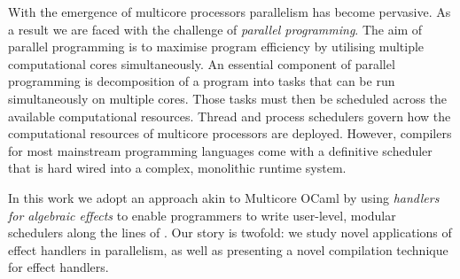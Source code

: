 \documentclass[12pt,mscres,cdtppar,twoside,openright,logo,rightchapter,normalheadings]{infthesis}
\theoremstyle{definition}
\begin{document}
%


%

With the emergence of multicore processors parallelism has become
pervasive. As a result we are faced with the challenge of
\emph{parallel programming}. The aim of parallel programming is to
maximise program efficiency by utilising multiple computational cores
simultaneously.
%
An essential component of parallel programming is decomposition of a
program into tasks that can be run simultaneously on multiple
cores. Those tasks must then be scheduled across the available
computational resources.  Thread and process schedulers govern how the
computational resources of multicore processors are deployed. However,
compilers for most mainstream programming languages come with a
definitive scheduler that is hard wired into a complex, monolithic
runtime system.



%


%

In this work we adopt an approach akin to Multicore OCaml
\citep{Dolan2014,Dolan2015} by using \emph{handlers for algebraic
  effects} \citep{Plotkin2001,Plotkin2003,Plotkin2013} to enable
programmers to write user-level, modular schedulers along the lines of
\citet{KC2016}. Our story is twofold: we study novel applications of
effect handlers in parallelism, as well as presenting a novel
compilation technique for effect handlers.
\end{document}
